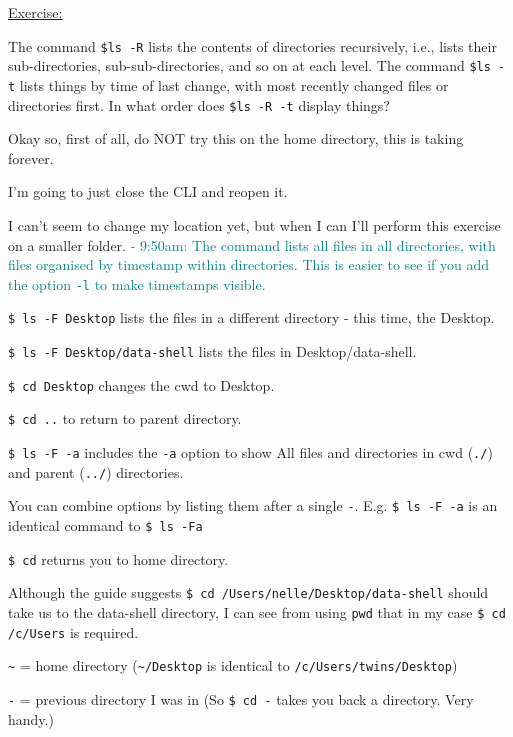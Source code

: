 \documentclass[12pt]{article}
\begin{document}
\vspace{1em}
\color{gray}\begin{addmargin}[1cm]{0cm}
\underline{Exercise:}

The command \texttt{\$ls -R} lists the contents of directories recursively, i.e., lists their sub-directories, sub-sub-directories, and so on at each level. The command \texttt{\$ls -t} lists things by time of last change, with most recently changed files or directories first. In what order does \texttt{\$ls -R -t} display things?

\color{black}
Okay so, first of all, do NOT try this on the home directory, this is taking forever. 

I'm going to just close the CLI and reopen it.

I can't seem to change my location yet, but when I can I'll perform this exercise on a smaller folder. \textcolor{teal}{\small{- 9:50am: The command lists all files in all directories, with files organised by timestamp within directories. This is easier to see if you add the option \texttt{-l} to make timestamps visible.}}
\end{addmargin}
\vspace{1em}
\color{black}
\texttt{\$ ls -F Desktop} lists the files in a different directory - this time, the Desktop.

\texttt{\$ ls -F Desktop/data-shell} lists the files in Desktop/data-shell.

\texttt{\$ cd Desktop} changes the cwd to Desktop.

\texttt{\$ cd ..} to return to parent directory.

\texttt{\$ ls -F -a} includes the \texttt{-a} option to show All files and directories in cwd (\texttt{./}) and parent (\texttt{../}) directories.

You can combine options by listing them after a single \texttt{-}. E.g. \texttt{\$ ls -F -a} is an identical command to \texttt{\$ ls -Fa}

\texttt{\$ cd} returns you to home directory.

Although the guide suggests \texttt{\$ cd /Users/nelle/Desktop/data-shell} should take us to the data-shell directory, I can see from using \texttt{pwd} that in my case \texttt{\$ cd /c/Users} is required.

\texttt{\textasciitilde} = home directory (\texttt{\textasciitilde/Desktop} is identical to \texttt{/c/Users/twins/Desktop})

\texttt{-} = previous directory I was in (So \texttt{\$ cd -} takes you back a directory. Very handy.)
\end{document}
